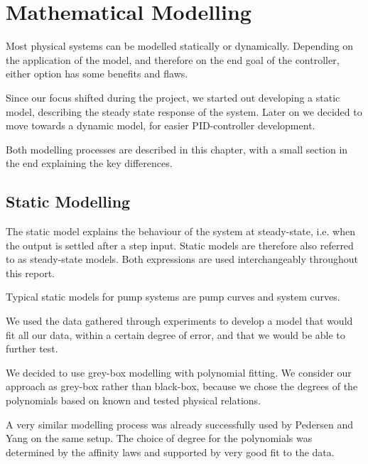 \chapter{Mathematical Modelling}\label{ch:mathmodel}

Most physical systems can be modelled statically or dynamically.
Depending on the application of the model,
and therefore on the end goal of the controller,
either option has some benefits and flaws.

Since our focus shifted during the project, we started out developing a static model,
describing the steady state response of the system.
Later on we decided to move towards a dynamic model, for easier PID-controller development.

Both modelling processes are described in this chapter,
with a small section in the end explaining the key differences.
\section{Static Modelling}\label{sec:statmod}

The static model explains the behaviour of the system at steady-state,
i.e. when the output is settled after a step input.
Static models are therefore also referred to as steady-state models.
Both expressions are used interchangeably throughout this report.

Typical static models for pump systems are pump curves and system curves.

We used the data gathered through experiments to develop a model that would fit all our data, within a certain degree of error, 
and that we would be able to further test.

We decided to use grey-box modelling with polynomial fitting.
We consider our approach as grey-box rather than black-box,
because we chose the degrees of the polynomials based on known and tested physical relations.

A very similar modelling process was already successfully used by Pedersen and Yang \cite{YangMultiPump2008} on the same setup.
The choice of degree for the polynomials was determined by the affinity laws \cite{Volk2014}
and supported by very good fit to the data.

